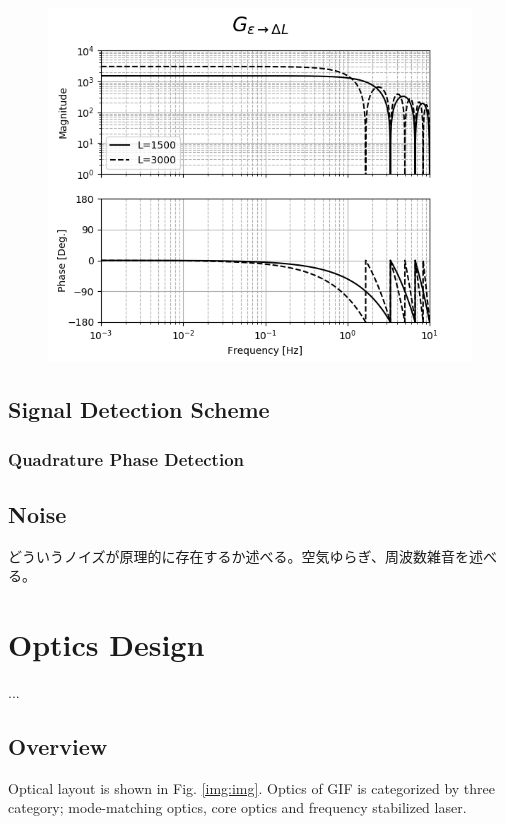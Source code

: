 \begin{figure}[h]
  \begin{center}
    \includegraphics[width=12.0cm]{./img_chap4/img412.png}
    \caption{}
  \end{center}
\end{figure}


\subsection{Signal Detection Scheme}
\subsubsection{Quadrature Phase Detection}


\subsection{Noise}
どういうノイズが原理的に存在するか述べる。空気ゆらぎ、周波数雑音を述べる。


\section{Optics Design} %
...\\
\subsection{Overview}
Optical layout is shown in Fig. \ref{img:img}. Optics of GIF is categorized by three category; mode-matching optics, core optics and frequency stabilized laser.

